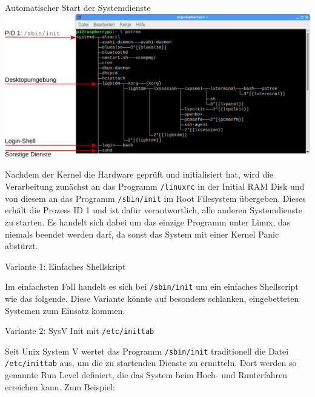 {
\footnotesize

\begin{frame}[allowframebreaks]{Automatischer Start der Systemdienste}
    \includegraphics[width=\textwidth]{8-linux/img/pid1-pstree}
    \medskip

    \parbox{\linewidth}{
        Nachdem der Kernel die Hardware geprüft und initialisiert hat, wird die
        Verarbeitung zunächst an das Programm \texttt{/linuxrc} in der Initial
        RAM Disk und von diesem an das Programm \texttt{/sbin/init} im Root
        Filesystem übergeben. Dieses erhält die Prozess ID 1 und ist dafür
        verantwortlich, alle anderen Systemdienste zu starten. Es handelt sich
        dabei um das einzige Programm unter Linux, das niemals beendet werden
        darf, da sonst das System mit einer Kernel Panic abstürzt.
    }

    \framebreak

    \begin{block}{Variante 1: Einfaches Shellskript}
        \smallskip
        \parbox{\linewidth}{
            Im einfachsten Fall handelt es sich bei \texttt{/sbin/init} um ein
            einfaches Shellscript wie das folgende. Diese Variante könnte auf
            besonders schlanken, eingebetteten Systemen zum Einsatz kommen.
        }

        
    \end{block}

    \framebreak

    \begin{block}{Variante 2: SysV Init mit \texttt{/etc/inittab}}
        \smallskip
        \parbox{\linewidth}{
            Seit Unix System V wertet das Programm \texttt{/sbin/init} traditionell
            die Datei \texttt{/etc/inittab} aus, um die zu startenden Dienste zu
            ermitteln. Dort werden so genannte Run Level definiert, die das System
            beim Hoch- und Runterfahren erreichen kann. Zum Beispiel:
        }


\end{block}
\end{frame}}

